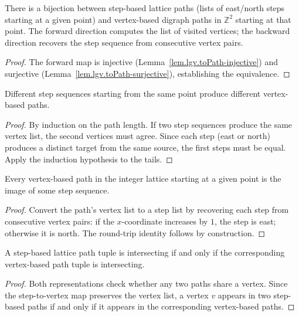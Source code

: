 \begin{lemma}
\label{lem.lgv.latticePath-equiv}
\leanhelper
\leanok
There is a bijection between step-based lattice paths
(lists of east/north steps starting at a given
point) and vertex-based digraph paths
in $\mathbb{Z}^2$ starting at that point.
The forward direction computes the list of visited vertices; the
backward direction recovers the step sequence from consecutive vertex pairs.
\end{lemma}

\begin{proof}
The forward map is injective
(Lemma~\ref{lem.lgv.toPath-injective}) and surjective
(Lemma~\ref{lem.lgv.toPath-surjective}), establishing the equivalence.
\end{proof}

\begin{lemma}
\label{lem.lgv.toPath-injective}
\leanhelper
\leanok
Different step sequences starting from the same point produce
different vertex-based paths.
\end{lemma}

\begin{proof}
\leanok
By induction on the path length.  If two step sequences produce the
same vertex list, the second vertices must agree.  Since each step
(east or north) produces a distinct target from the same source,
the first steps must be equal.  Apply the induction hypothesis to the tails.
\end{proof}

\begin{lemma}
\label{lem.lgv.toPath-surjective}
\leanhelper
\leanok
Every vertex-based path in the integer lattice starting at a
given point is the image of some step sequence.
\end{lemma}

\begin{proof}
\leanok
Convert the path's vertex list to a step list by recovering each step from consecutive
vertex pairs: if the $x$-coordinate increases by $1$, the step is east; otherwise it is north.
The round-trip identity follows by construction.
\end{proof}

\begin{lemma}
\label{lem.lgv.latticePath-tuple-intersecting}
\leanhelper
\leanok
A step-based lattice path tuple is intersecting if and only if
the corresponding vertex-based path tuple is intersecting.
\end{lemma}

\begin{proof}
\leanok
Both representations check whether any two paths share a vertex.
Since the step-to-vertex map preserves the vertex list, a vertex $v$
appears in two step-based paths if and only if it appears in the
corresponding vertex-based paths.
\end{proof}
